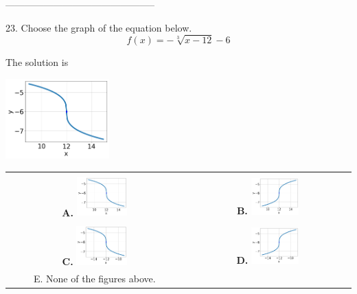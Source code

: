 \documentclass{extbook}[14pt]
\begin{document}
-----------------------------------------------

23. Choose the graph of the equation below.
\[ f(x) = - \sqrt[3]{x - 12} - 6 \] 

 
 The solution is  
 \begin{center} \includegraphics[width=0.3\textwidth]{../Figures/radicalEquationToGraphDA.png} \end{center}\begin{tabular}{|c|c|} 
\hline 
 & \tabularnewline 
 \textbf{A.} \includegraphics[width=0.3\textwidth]{../Figures/radicalEquationToGraphDA.png} & \textbf{B.} \includegraphics[width=0.3\textwidth]{../Figures/radicalEquationToGraphCA.png} \tabularnewline 
\hline 
 & \tabularnewline 
 \textbf{C.} \includegraphics[width=0.3\textwidth]{../Figures/radicalEquationToGraphAA.png} & \textbf{D.} \includegraphics[width=0.3\textwidth]{../Figures/radicalEquationToGraphBA.png} \tabularnewline 
\hline 
 E. None of the figures above. & \tabularnewline 
\hline 
 \end{tabular} 
 
\end{document}
